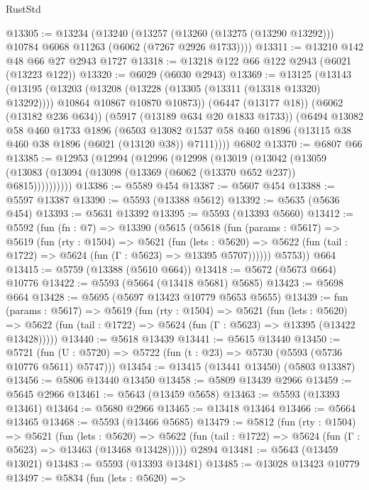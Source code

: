 \begin{lexlean}{RustStd}
\begin{coremodule}
@13305 := @13234
    (@13240
      (@13257 (@13260 (@13275 (@13290 @13292))) @10784 @6068 @11263 (@6062 (@7267 @2926 @1733))))
@13311 := @13210 @142 @48 @66 @27 @2943 @1727
@13318 := @13218 @122 @66 @122 @2943 (@6021 (@13223 @122))
@13320 := @6029 (@6030 @2943)
@13369 := @13125
    (@13143
      (@13195
        (@13203
          (@13208 (@13228 (@13305 (@13311 (@13318 @13320) @13292))))
          @10864
          @10867
          @10870
          @10873))
      (@6447 (@13177 @18))
      (@6062 (@13182 @236 @634))
      (@5917 (@13189 @634 @20 @1833 @1733))
      (@6494
        @13082
        @58
        @460
        @1733
        @1896
        (@6503 @13082 @1537 @58 @460 @1896 (@13115 @38 @460 @38 @1896 (@6021 (@13120 @38)) @7111))))
    @6802
@13370 := @6807 @66
@13385 := @12953
    (@12994
      (@12996
        (@12998
          (@13019
            (@13042
              (@13059 (@13083 (@13094 (@13098 (@13369 (@6062 (@13370 @652 @237)) @6815))))))))))
@13386 := @5589 @454
@13387 := @5607 @454
@13388 := @5597 @13387
@13390 := @5593 (@13388 @5612)
@13392 := @5635 (@5636 @454)
@13393 := @5631 @13392
@13395 := @5593 (@13393 @5660)
@13412 := @5592
    (fun (fn : @7) =>
    @13390
      (@5615
        (@5618
          (fun (params : @5617) =>
          @5619
            (fun (rty : @1504) =>
            @5621
              (fun (lets : @5620) =>
              @5622 (fun (tail : @1722) => @5624 (fun (Γ : @5623) => @13395 @5707))))))
        @5753))
    @664
@13415 := @5759 (@13388 (@5610 @664))
@13418 := @5672 (@5673 @664) @10776
@13422 := @5593 (@5664 (@13418 @5681) @5685)
@13423 := @5698 @664
@13428 := @5695 (@5697 @13423 @10779 @5653 @5655)
@13439 := fun (params : @5617) =>
  @5619
    (fun (rty : @1504) =>
    @5621
      (fun (lets : @5620) =>
      @5622 (fun (tail : @1722) => @5624 (fun (Γ : @5623) => @13395 (@13422 @13428)))))
@13440 := @5618 @13439
@13441 := @5615 @13440
@13450 := @5721
    (fun (U : @5720) => @5722 (fun (t : @23) => @5730 (@5593 (@5736 @10776 @5611) @5747)))
@13454 := @13415 (@13441 @13450) (@5803 @13387)
@13456 := @5806 @13440 @13450
@13458 := @5809 @13439 @2966
@13459 := @5645 @2966
@13461 := @5643 (@13459 @5658)
@13463 := @5593 (@13393 @13461)
@13464 := @5680 @2966
@13465 := @13418 @13464
@13466 := @5664 @13465
@13468 := @5593 (@13466 @5685)
@13479 := @5812
    (fun (rty : @1504) =>
    @5621
      (fun (lets : @5620) =>
      @5622 (fun (tail : @1722) => @5624 (fun (Γ : @5623) => @13463 (@13468 @13428)))))
    @2894
@13481 := @5643 (@13459 @13021)
@13483 := @5593 (@13393 @13481)
@13485 := @13028 @13423 @10779
@13497 := @5834
    (fun (lets : @5620) =>

\end{coremodule}
\end{lexlean}

